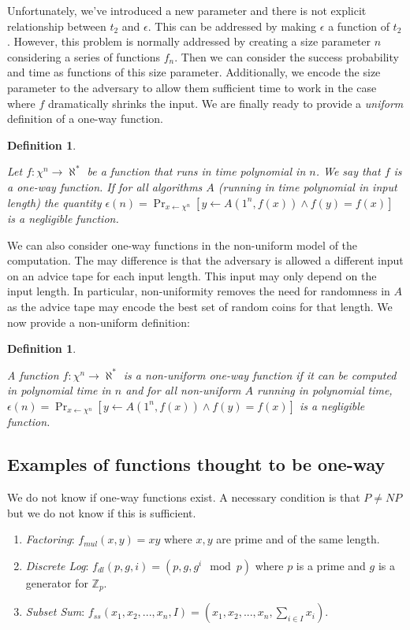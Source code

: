 \documentclass{article}
\newtheorem{defn}[thm]{Definition}
\newenvironment{definition}{\begin{defn}\begin{em}}%
{\end{em}\end{defn}}
\begin{document}
Unfortunately, we've introduced a new parameter and there is not explicit relationship between $t_2$ and $\epsilon$.  This can be addressed by making $\epsilon$ a function of $t_2$.  However, this problem is normally addressed by creating a size parameter $n$ considering a series of functions $f_n$.  Then we can consider the success probability and time as functions of this size parameter.  Additionally, we encode the size parameter to the adversary to allow them sufficient time to work in the case where $f$ dramatically shrinks the input.  We are finally ready to provide a \emph{uniform} definition of a one-way function.
\begin{definition}
Let $f:\chi^n\rightarrow \aleph^*$ be a function that runs in time polynomial in $n$.  We say that $f$ is a \emph{one-way} function.  If for all algorithms $A$ (running in time polynomial in input length) the quantity $\epsilon(n) = \Pr_{x\leftarrow \chi^n} [y\leftarrow A(1^n, f(x)) \wedge f(y) = f(x)]$ is a negligible function.
\end{definition}
We can also consider one-way functions in the non-uniform model of the computation.  The may difference is that the adversary is allowed a different input on an advice tape for each input length.  This input may only depend on the input length.  In particular, non-uniformity removes the need for randomness in $A$ as the advice tape may encode the best set of random coins for that length.  We now provide a non-uniform definition:
\begin{definition}
A function $f:\chi^n\rightarrow \aleph^*$ is a \emph{non-uniform one-way} function if it can be computed in polynomial time in $n$ and for all non-uniform $A$ running in polynomial time, 
$\epsilon(n) = \Pr_{x\leftarrow \chi^n}[y\leftarrow A(1^n, f(x)) \wedge f(y) = f(x)]$ is a negligible function.
\end{definition}

\subsection{Examples of functions thought to be one-way}
We do not know if one-way functions exist.  A necessary condition is that $P\neq NP$ but we do not know if this is sufficient.
\begin{enumerate}  
\item \emph{Factoring}: $f_{mul}(x, y) =xy$ where $x,y$ are prime and of the same length.
\item \emph{Discrete Log}: $f_{dl}(p, g, i) = (p, g, g^i \mod p)$ where $p$ is a prime and $g$ is a generator for $\mathbb{Z}_p$.
\item \emph{Subset Sum}: $f_{ss}(x_1,x_2,...,x_n,I) = (x_1,x_2,...,x_n, \sum_{i\in I} x_i)$.
\end{enumerate}
\end{document}

